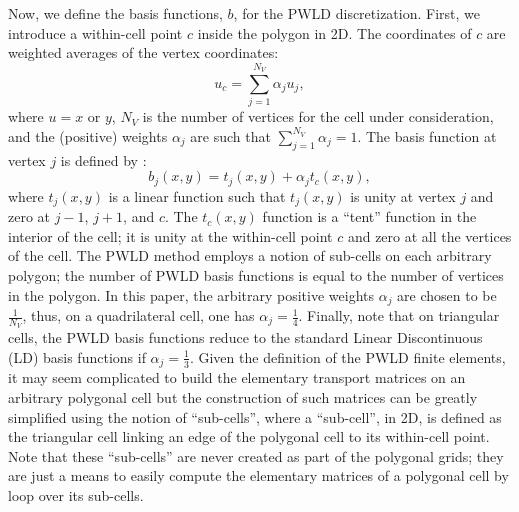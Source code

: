 Now, we define the basis functions, $b$, for the PWLD discretization. First, we
introduce a within-cell point $c$ inside the polygon in 2D. The coordinates 
of $c$ are weighted averages of the vertex coordinates:
\begin{equation}
  u_c = \sum_{j=1}^{N_V} \alpha_j u_j,
\end{equation}
where $u=x$ or $y$, $N_V$ is the number of vertices for the cell under
consideration, and the (positive) weights $\alpha_j$ are such that $\sum_{j=1}^{N_V} \alpha_j =1$. 
The basis function at vertex $j$ is defined by 
\cite{pwld_2d}:
\begin{equation}
  b_j(x,y) = t_j(x,y) + \alpha_j t_c(x,y),
\end{equation}
where $t_j(x,y)$ is a linear function such that $t_j(x,y)$ is unity at vertex
$j$ and zero at $j-1$, $j+1$, and $c$. The $t_c(x,y)$ function is a ``tent''
function in the interior of the cell; it is unity at the within-cell point $c$
and zero at all the vertices of the cell. The PWLD method employs a notion of 
sub-cells on each arbitrary polygon; the number of PWLD basis functions is 
equal to the number of vertices in the polygon. In this paper, the arbitrary
positive weights $\alpha_j$ are chosen to be $\frac{1}{N_V}$, thus, on a
quadrilateral cell, one has $\alpha_j =\frac{1}{4}$. Finally, note that on
triangular cells, the PWLD basis functions reduce to the
standard Linear Discontinuous (LD) basis functions if $\alpha_j =
\frac{1}{3}$. Given the definition of the PWLD
finite elements, it may seem complicated to build the elementary transport 
matrices on an arbitrary polygonal cell but the construction of such matrices
can be greatly simplified using the notion of ``sub-cells'', where a ``sub-cell'',
in 2D, is defined as the triangular cell linking an edge of the polygonal cell to its
within-cell point. Note that these ``sub-cells'' are never created as part of the 
polygonal grids; they are just a means to easily compute the elementary matrices of 
a polygonal cell by loop over its sub-cells.
